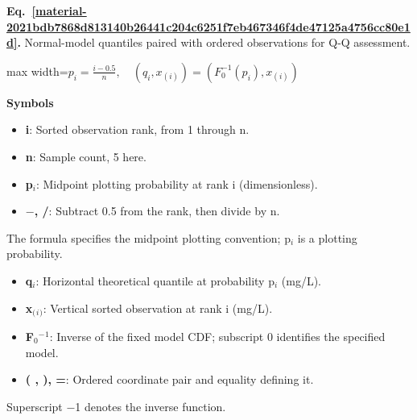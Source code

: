 \documentclass[11pt,a4paper]{article}
\begin{document}
\par\medskip
\noindent\begin{minipage}{\linewidth}
\label{material-2021bdb7868d813140b26441c204c6251f7eb467346f4de47125a4756cc80e1d}
\noindent\textbf{Eq.~\ref*{material-2021bdb7868d813140b26441c204c6251f7eb467346f4de47125a4756cc80e1d}.} Normal-model quantiles paired with ordered observations for Q-Q assessment.\par\nopagebreak
\begin{center}\begin{adjustbox}{max width=\linewidth}$\displaystyle p_i=\frac{i-0.5}{n},\quad (q_i,x_{(i)})=(F_0^{-1}(p_i),x_{(i)})$\end{adjustbox}\end{center}

\par\noindent\textbf{Symbols}

\begin{itemize}\setlength{\itemsep}{1pt}\setlength{\parsep}{0pt}
\item \textbf{i}: Sorted observation rank, from 1 through n.
\item \textbf{n}: Sample count, 5 here.
\item \textbf{p\ensuremath{{}_i}}: Midpoint plotting probability at rank i (dimensionless).
\item \textbf{\ensuremath{-}, /}: Subtract 0.5 from the rank, then divide by n.
\end{itemize}

The formula specifies the midpoint plotting convention; p\ensuremath{{}_i} is a plotting probability.

\begin{itemize}\setlength{\itemsep}{1pt}\setlength{\parsep}{0pt}
\item \textbf{q\ensuremath{{}_i}}: Horizontal theoretical quantile at probability p\ensuremath{{}_i} (mg/L).
\item \textbf{x\ensuremath{{}_{(}}\ensuremath{{}_i}\ensuremath{{}_{)}}}: Vertical sorted observation at rank i (mg/L).
\item \textbf{F\ensuremath{{}_0}\ensuremath{{}^-}\ensuremath{{}^1}}: Inverse of the fixed model CDF; subscript 0 identifies the specified model.
\item \textbf{( , ), =}: Ordered coordinate pair and equality defining it.
\end{itemize}

Superscript \ensuremath{-}1 denotes the inverse function.

\end{minipage}\par
\medskip
\end{document}
